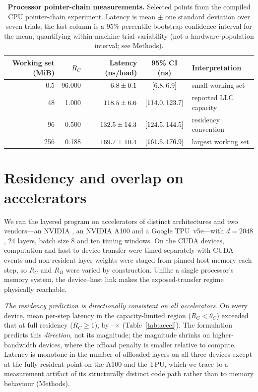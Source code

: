 \begin{table}[t]
\centering
\caption{\textbf{Processor pointer-chain measurements.} Selected points from the
compiled CPU pointer-chain experiment.
Latency is mean $\pm$ one standard deviation over seven trials; the last column
is a 95\% percentile bootstrap confidence interval for the mean, quantifying
within-machine trial variability (not a hardware-population interval; see
Methods).}
\label{tab:cpu_probe}
\begin{tabular}{rrrcl}
\toprule
Working set (MiB) & $R_C$ & Latency (ns/load) & 95\% CI (ns) & Interpretation\\
\midrule
0.5 & 96.000 & $6.8\pm0.1$ & $[6.8,6.9]$ & small working set\\
48  & 1.000  & $118.5\pm6.6$ & $[114.0,123.7]$ & reported LLC capacity\\
96  & 0.500  & $132.5\pm14.3$ & $[124.5,144.5]$ & residency convention\\
256 & 0.188  & $169.7\pm10.4$ & $[161.5,176.9]$ & largest working set\\
\bottomrule
\end{tabular}
\end{table}

\section*{Residency and overlap on accelerators}
\label{sec:gpu}

We ran the layered program on \NumAccel{} accelerators of distinct
architectures and two vendors---an NVIDIA \GpuDevice{}, an NVIDIA A100 and a
Google TPU~v5e---with $d=2048$, 24 layers, batch size 8 and ten timing windows.
On the CUDA devices, computation and host-to-device transfer were timed
separately with CUDA events and non-resident layer weights were staged from
pinned host memory each step, so $R_C$ and $R_B$ were varied by construction.
Unlike a single processor's memory system, the device--host link makes the
exposed-transfer regime physically reachable.

\emph{The residency prediction is directionally consistent on all
\NumAccel{} accelerators.} On every device, mean per-step latency in the
capacity-limited region ($R_C<\theta_C$) exceeded that at full residency
($R_C\geq1$), by \AccelCapRatioMin--\AccelCapRatioMax$\times$
(Table~\ref{tab:accel}). The formulation predicts this \emph{direction}, not its
magnitude; the magnitude shrinks on higher-bandwidth devices, where the offload
penalty is smaller relative to compute. Latency is monotone in the number of
offloaded layers on all three devices except at the fully resident point on the
A100 and the TPU, which we trace to a measurement artifact of its structurally
distinct code path rather than to memory behaviour (Methods).

